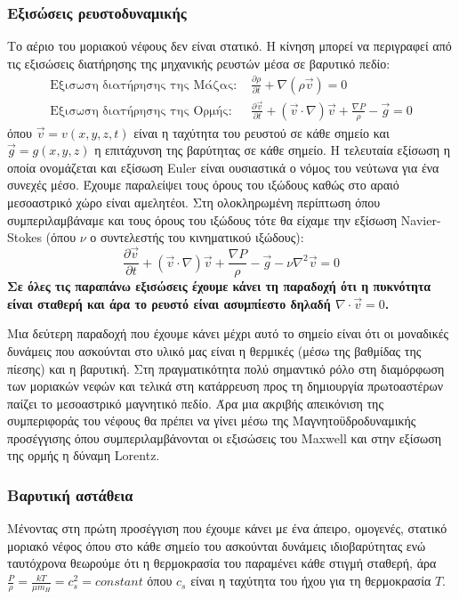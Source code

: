 \documentclass[a4paper,12pt]{memoir}
\newcommand{\pt}[1]{\frac{\partial #1}{\partial t}}
\newcommand{\vv}{\vec{v}}
\begin{document}
\subsubsection{Εξισώσεις ρευστοδυναμικής}
Το αέριο του μοριακού νέφους δεν είναι στατικό. Η κίνηση μπορεί να περιγραφεί από τις εξισώσεις διατήρησης της μηχανικής ρευστών μέσα σε βαρυτικό πεδίο:
\begin{align}
\text{Εξισωση διατήρησης της Μάζας:  } &\pt{\rho} + \nabla (\rho \vv)=0 \\
\text{Εξισωση διατήρησης της Ορμής:  } &\pt{\vv} +(\vv \cdot \nabla) \vv +\frac{\nabla P}{\rho} -\vec{g}=0
\label{eq:euler}
\end{align}
όπου $\vv=v(x,y,z,t)$ είναι η ταχύτητα του ρευστού σε κάθε σημείο και $\vec{g}=g(x,y,z)$ η επιτάχυνση της βαρύτητας σε κάθε σημείο.
Η τελευταία εξίσωση η οποία ονομάζεται και εξίσωση Euler είναι ουσιαστικά ο νόμος του νεύτωνα για ένα συνεχές μέσο.
Έχουμε παραλείψει τους όρους του ιξώδους καθώς στο αραιό μεσοαστρικό χώρο είναι αμελητέοι. Στη ολοκληρωμένη περίπτωση όπου συμπεριλαμβάναμε και τους όρους του ιξώδους τότε θα είχαμε την εξίσωση Navier-Stokes (όπου $\nu$ ο συντελεστής του κινηματικού ιξώδους): 
$$
\pt{\vv} +(\vv \cdot \nabla) \vv +\frac{\nabla P}{\rho} -\vec{g}-\nu \nabla ^2 \vv=0
$$
\textbf{Σε όλες τις παραπάνω εξισώσεις έχουμε κάνει τη παραδοχή ότι η πυκνότητα είναι σταθερή και άρα το ρευστό είναι ασυμπίεστο δηλαδή $\nabla \cdot \vv = 0$.}

Μια δεύτερη παραδοχή που έχουμε κάνει μέχρι αυτό το σημείο είναι ότι οι μοναδικές δυνάμεις που ασκούνται στο υλικό μας είναι η θερμικές (μέσω της βαθμίδας της πίεσης) και η βαρυτική. Στη πραγματικότητα πολύ σημαντικό ρόλο στη διαμόρφωση των μοριακών νεφών και τελικά στη κατάρρευση προς τη δημιουργία πρωτοαστέρων παίζει το μεσοαστρικό μαγνητικό πεδίο. Άρα μια ακριβής απεικόνιση της συμπεριφοράς του νέφους θα πρέπει να γίνει μέσω της Μαγνητοϋδροδυναμικής προσέγγισης όπου συμπεριλαμβάνονται οι εξισώσεις του Maxwell και στην εξίσωση της ορμής η δύναμη Lorentz.    

\subsubsection{Βαρυτική αστάθεια}
Μένοντας στη πρώτη προσέγγιση που έχουμε κάνει με ένα άπειρο, ομογενές, στατικό μοριακό νέφος όπου στο κάθε σημείο του ασκούνται δυνάμεις ιδιοβαρύτητας ενώ ταυτόχρονα θεωρούμε ότι η θερμοκρασία του παραμένει κάθε στιγμή σταθερή, άρα $\frac{P}{\rho}=\frac{kT}{\mu m_{H}}=c_s^2=constant$ όπου $c_s$ είναι η ταχύτητα του ήχου για τη θερμοκρασία $T$.
\end{document}
